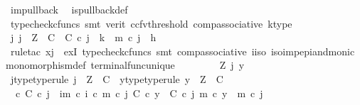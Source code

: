 \begin{isabellebody}
\ {\isasymchi}im{\isacharunderscore}{\kern0pt}pullback\ \isamarkupfalse%
\ is{\isacharunderscore}{\kern0pt}pullback{\isacharunderscore}{\kern0pt}def\ \isamarkupfalse%
\ {\isacharparenleft}{\kern0pt}typecheck{\isacharunderscore}{\kern0pt}cfuncs{\isacharcomma}{\kern0pt}\ smt\ {\isacharparenleft}{\kern0pt}verit{\isacharcomma}{\kern0pt}\ ccfv{\isacharunderscore}{\kern0pt}threshold{\isacharparenright}{\kern0pt}\ comp{\isacharunderscore}{\kern0pt}associative{}\ k{\isacharunderscore}{\kern0pt}type{\isacharparenright}{\kern0pt}\isanewline
\ \ \ \ \isamarkupfalse%
\ \isamarkupfalse%
\ {\isachardoublequoteopen}{\isasymexists}j{\isachardot}{\kern0pt}\ j\ {\isacharcolon}{\kern0pt}\ Z\ {\isasymrightarrow}\ C\ {\isasymand}\ {\isasymbeta}\isactrlbsub C\isactrlesub \ {\isasymcirc}\isactrlsub c\ j\ {\isacharequal}{\kern0pt}\ k\ {\isasymand}\ m\ {\isasymcirc}\isactrlsub c\ j\ {\isacharequal}{\kern0pt}\ h{\isachardoublequoteclose}\isanewline
\ \ \ \ \ \ \isamarkupfalse%
\ {\isacharparenleft}{\kern0pt}rule{\isacharunderscore}{\kern0pt}tac\ x{\isacharequal}{\kern0pt}{\isachardoublequoteopen}j{\isachardoublequoteclose}\ \ exI{\isacharcomma}{\kern0pt}\ typecheck{\isacharunderscore}{\kern0pt}cfuncs{\isacharcomma}{\kern0pt}\ smt\ comp{\isacharunderscore}{\kern0pt}associative{}\ i{\isacharunderscore}{\kern0pt}iso\ iso{\isacharunderscore}{\kern0pt}imp{\isacharunderscore}{\kern0pt}epi{\isacharunderscore}{\kern0pt}and{\isacharunderscore}{\kern0pt}monic\ monomorphism{\isacharunderscore}{\kern0pt}def{}\ terminal{\isacharunderscore}{\kern0pt}func{\isacharunderscore}{\kern0pt}unique{\isacharparenright}{\kern0pt}\isanewline
\ \ \isamarkupfalse%
\isanewline
\ \ \ \ \isamarkupfalse%
\ Z\ j\ y\isanewline
\ \ \ \ \isamarkupfalse%
\ j{\isacharunderscore}{\kern0pt}type{\isacharbrackleft}{\kern0pt}type{\isacharunderscore}{\kern0pt}rule{\isacharbrackright}{\kern0pt}{\isacharcolon}{\kern0pt}\ {\isachardoublequoteopen}j\ {\isacharcolon}{\kern0pt}\ Z\ {\isasymrightarrow}\ C{\isachardoublequoteclose}\ \ y{\isacharunderscore}{\kern0pt}type{\isacharbrackleft}{\kern0pt}type{\isacharunderscore}{\kern0pt}rule{\isacharbrackright}{\kern0pt}{\isacharcolon}{\kern0pt}\ {\isachardoublequoteopen}y\ {\isacharcolon}{\kern0pt}\ Z\ {\isasymrightarrow}\ C{\isachardoublequoteclose}\isanewline
\ \ \ \ \isamarkupfalse%
\ {\isachardoublequoteopen}{\isasymt}\ {\isasymcirc}\isactrlsub c\ {\isasymbeta}\isactrlbsub C\isactrlesub \ {\isasymcirc}\isactrlsub c\ j\ {\isacharequal}{\kern0pt}\ {\isacharparenleft}{\kern0pt}{\isasymchi}im\ {\isasymcirc}\isactrlsub c\ i{\isacharparenright}{\kern0pt}\ {\isasymcirc}\isactrlsub c\ m\ {\isasymcirc}\isactrlsub c\ j{\isachardoublequoteclose}\ {\isachardoublequoteopen}{\isasymbeta}\isactrlbsub C\isactrlesub \ {\isasymcirc}\isactrlsub c\ y\ {\isacharequal}{\kern0pt}\ {\isasymbeta}\isactrlbsub C\isactrlesub \ {\isasymcirc}\isactrlsub c\ j{\isachardoublequoteclose}\ {\isachardoublequoteopen}m\ {\isasymcirc}\isactrlsub c\ y\ {\isacharequal}{\kern0pt}\ m\ {\isasymcirc}\isactrlsub c\ j{\isachardoublequoteclose}\isanewline

\end{isabellebody}
